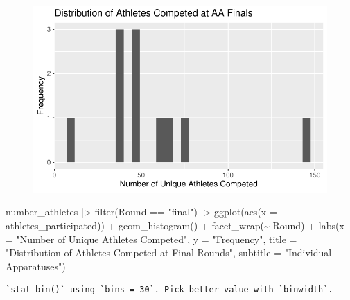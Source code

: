 \documentclass[
  letterpaper,
  DIV=11,
  numbers=noendperiod]{scrartcl}
\newenvironment{Shaded}{\begin{snugshade}}{\end{snugshade}}
\newcommand{\AttributeTok}[1]{\textcolor[rgb]{0.40,0.45,0.13}{#1}}
\newcommand{\FunctionTok}[1]{\textcolor[rgb]{0.28,0.35,0.67}{#1}}
\newcommand{\NormalTok}[1]{\textcolor[rgb]{0.00,0.23,0.31}{#1}}
\newcommand{\SpecialCharTok}[1]{\textcolor[rgb]{0.37,0.37,0.37}{#1}}
\newcommand{\StringTok}[1]{\textcolor[rgb]{0.13,0.47,0.30}{#1}}
\begin{document}
\begin{figure}[H]

{\centering \includegraphics{Main_files/figure-pdf/unnamed-chunk-6-2.pdf}

}

\end{figure}

\begin{Shaded}
\begin{Highlighting}[]
\NormalTok{number\_athletes }\SpecialCharTok{|\textgreater{}}
  \FunctionTok{filter}\NormalTok{(Round }\SpecialCharTok{==} \StringTok{"final"}\NormalTok{) }\SpecialCharTok{|\textgreater{}}
  \FunctionTok{ggplot}\NormalTok{(}\FunctionTok{aes}\NormalTok{(}\AttributeTok{x =}\NormalTok{ athletes\_participated)) }\SpecialCharTok{+}
    \FunctionTok{geom\_histogram}\NormalTok{() }\SpecialCharTok{+}
    \FunctionTok{facet\_wrap}\NormalTok{(}\SpecialCharTok{\textasciitilde{}}\NormalTok{ Round) }\SpecialCharTok{+}
    \FunctionTok{labs}\NormalTok{(}\AttributeTok{x =} \StringTok{"Number of Unique Athletes Competed"}\NormalTok{,}
         \AttributeTok{y =} \StringTok{"Frequency"}\NormalTok{,}
         \AttributeTok{title =} \StringTok{"Distribution of Athletes Competed at Final Rounds"}\NormalTok{,}
         \AttributeTok{subtitle =} \StringTok{"Individual Apparatuses"}\NormalTok{)}
\end{Highlighting}
\end{Shaded}

\begin{verbatim}
`stat_bin()` using `bins = 30`. Pick better value with `binwidth`.
\end{verbatim}
\end{document}
